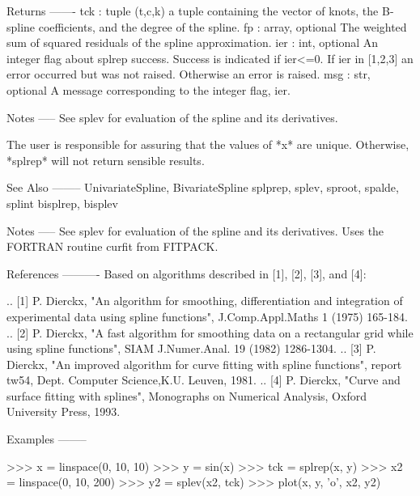 \begin{DoxyVerb}
Returns
-------
tck : tuple
    (t,c,k) a tuple containing the vector of knots, the B-spline
    coefficients, and the degree of the spline.
fp : array, optional
    The weighted sum of squared residuals of the spline approximation.
ier : int, optional
    An integer flag about splrep success. Success is indicated if ier<=0.
    If ier in [1,2,3] an error occurred but was not raised. Otherwise an
    error is raised.
msg : str, optional
    A message corresponding to the integer flag, ier.

Notes
-----
See splev for evaluation of the spline and its derivatives.

The user is responsible for assuring that the values of *x* are unique.
Otherwise, *splrep* will not return sensible results.

See Also
--------
UnivariateSpline, BivariateSpline
splprep, splev, sproot, spalde, splint
bisplrep, bisplev

Notes
-----
See splev for evaluation of the spline and its derivatives. Uses the
FORTRAN routine curfit from FITPACK.

References
----------
Based on algorithms described in [1], [2], [3], and [4]:

.. [1] P. Dierckx, "An algorithm for smoothing, differentiation and
   integration of experimental data using spline functions",
   J.Comp.Appl.Maths 1 (1975) 165-184.
.. [2] P. Dierckx, "A fast algorithm for smoothing data on a rectangular
   grid while using spline functions", SIAM J.Numer.Anal. 19 (1982)
   1286-1304.
.. [3] P. Dierckx, "An improved algorithm for curve fitting with spline
   functions", report tw54, Dept. Computer Science,K.U. Leuven, 1981.
.. [4] P. Dierckx, "Curve and surface fitting with splines", Monographs on
   Numerical Analysis, Oxford University Press, 1993.

Examples
--------

>>> x = linspace(0, 10, 10)
>>> y = sin(x)
>>> tck = splrep(x, y)
>>> x2 = linspace(0, 10, 200)
>>> y2 = splev(x2, tck)
>>> plot(x, y, 'o', x2, y2)\end{DoxyVerb}
 \hypertarget{namespacescipy_1_1interpolate_1_1fitpack_ad4d36dd0002fb4920b5a0f51a8d1e2ad}{}
